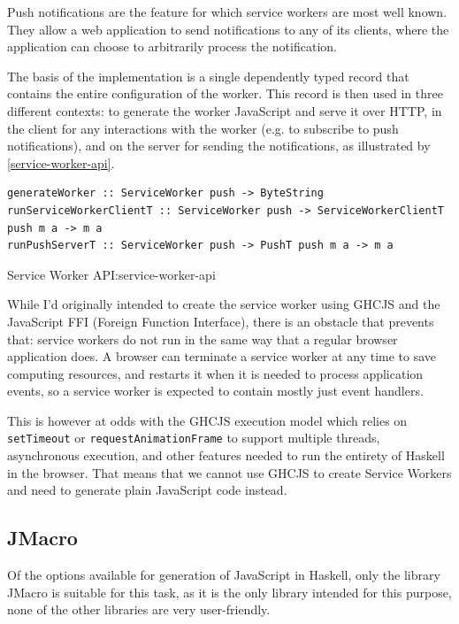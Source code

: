 \documentclass[english,odsaz]{fitthesis}
\begin{document}
Push notifications are the feature for which service workers are most well
known. They allow a web application to send notifications to any of its clients,
where the application can choose to arbitrarily process the notification.

The basis of the implementation is a single dependently typed record that
contains the entire configuration of the worker. This record is then used in
three different contexts: to generate the worker JavaScript and serve it over
HTTP, in the client for any interactions with the worker (e.g. to subscribe to
push notifications), and on the server for sending the notifications, as
illustrated by \ref{service-worker-api}.

\begin{listing}[htbp]
\begin{verbatim}
generateWorker :: ServiceWorker push -> ByteString
runServiceWorkerClientT :: ServiceWorker push -> ServiceWorkerClientT push m a -> m a
runPushServerT :: ServiceWorker push -> PushT push m a -> m a
\end{verbatim}
\caption{Service Worker API:service-worker-api}
\end{listing}

While I'd originally intended to create the service worker using GHCJS and the
JavaScript FFI (Foreign Function Interface), there is an obstacle that prevents
that: service workers do not run in the same way that a regular browser
application does. A browser can terminate a service worker at any time to save
computing resources, and restarts it when it is needed to process application
events, so a service worker is expected to contain mostly just event handlers.

This is however at odds with the GHCJS execution model which relies on
\texttt{setTimeout} or \texttt{requestAnimationFrame} to support multiple threads, asynchronous
execution, and other features needed to run the entirety of Haskell in the
browser. That means that we cannot use GHCJS to create Service Workers and need
to generate plain JavaScript code instead.

\subsection{JMacro}
\label{sec:org6ebfda8}
Of the options available for generation of JavaScript in Haskell, only the
library JMacro is suitable for this task, as it is the only library intended for
this purpose, none of the other libraries are very user-friendly.
\end{document}
